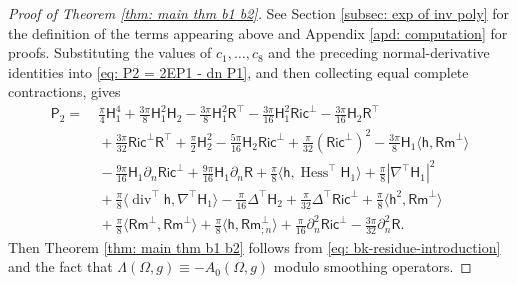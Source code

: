 \documentclass[11pt]{amsart}
\newcommand{\dvg}{\operatorname{div}}
\newcommand{\Hess}{\operatorname{Hess}}
\theoremstyle{definition}
\numberwithin{equation}{section}
\begin{document}
\begin{proof}[Proof of Theorem \ref{thm: main thm b1 b2}]
See Section \ref{subsec: exp of inv poly} for the definition of the terms appearing above and Appendix \ref{apd: computation} for proofs. Substituting the values of $c_1,\dots,c_8$ and the preceding normal-derivative identities into \eqref{eq: P2 = 2EP1 - dn P1}, and then collecting equal complete contractions, gives
\begin{equation}
\label{eq: general P_2}
\begin{aligned}
\mathsf P_2 = &\ \frac{\pi}{4}\mathsf H_1^4 + \frac{3\pi}{8}\mathsf H_1^2\mathsf H_2 - \frac{3\pi}{8}\mathsf H_1^2\mathsf R^\top - \frac{3\pi}{16}\mathsf H_1^2\mathsf{Ric}^\bot - \frac{3\pi}{16}\mathsf H_2\mathsf R^\top \\
&\ + \frac{3\pi}{32}\mathsf{Ric}^\bot\mathsf R^\top + \frac{\pi}{2}\mathsf H_2^2 - \frac{5\pi}{16}\mathsf H_2\mathsf{Ric}^\bot + \frac{\pi}{32}(\mathsf{Ric}^\bot)^2 - \frac{3\pi}{8}\mathsf H_1\langle\mathsf h,\mathsf{Rm}^\bot\rangle\\
&\ - \frac{9\pi}{16}\mathsf H_1\partial_n\mathsf{Ric}^\bot + \frac{9\pi}{16}\mathsf H_1\partial_n\mathsf R + \frac{\pi}{8}\langle\mathsf h,\Hess^\top\mathsf H_1\rangle + \frac{\pi}{8}|\nabla^\top\mathsf H_1|^2\\
&\ + \frac{\pi}{8}\langle\dvg^\top\mathsf h,\nabla^\top\mathsf H_1\rangle - \frac{\pi}{16}\Delta^\top\mathsf H_2 + \frac{\pi}{32}\Delta^\top\mathsf{Ric}^\bot + \frac{\pi}{8}\langle\mathsf h^2,\mathsf{Rm}^\bot\rangle\\
&\ + \frac{\pi}{8}\langle\mathsf{Rm}^\bot,\mathsf{Rm}^\bot\rangle + \frac{\pi}{8}\langle\mathsf h,\mathsf{Rm}^\bot_{;n}\rangle + \frac{\pi}{16}\partial_n^2\mathsf{Ric}^\bot - \frac{3\pi}{32}\partial_n^2\mathsf R.
\end{aligned}
\end{equation}
Then Theorem \ref{thm: main thm b1 b2} follows from \eqref{eq: bk-residue-introduction} and the fact that $\Lambda(\Omega,g)\equiv -A_0(\Omega,g)$ modulo smoothing operators. 
\end{proof}
\end{document}
